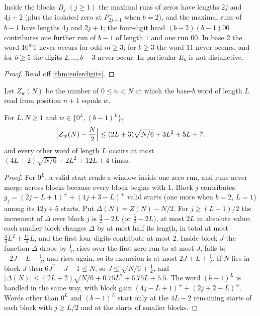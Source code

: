 \documentclass[11pt]{article}
\begin{document}
\begin{corollary}\label{cor:missing}
Inside the blocks $B_j$ $(j\ge1)$ the maximal runs of zeros have lengths $2j$ and $4j+2$
(plus the isolated zero at $P_{2j+1}^-$ when $b=2$), and the maximal runs of $b-1$ have
lengths $4j$ and $2j+1$; the four-digit head $(b-2)(b-1)00$ contributes one further run of
$b-1$ of length $1$ and one run $00$. In base
$2$ the word $10^m1$ never occurs for odd $m\ge3$; for $b\ge3$ the word $11$ never occurs,
and for $b\ge5$ the digits $2,\dots,b-3$ never occur. In particular $E_b$ is not
disjunctive.
\end{corollary}

\begin{proof}
Read off \cref{thm:eulerdigits}.
\end{proof}

Let $Z_w(N)$ be the number of $0\le n<N$ at which the base-$b$ word of length $L$ read
from position $n+1$ equals $w$.

\begin{theorem}\label{thm:eulerwords}
For $L,N\ge1$ and $w\in\{0^L,(b-1)^L\}$,
\[
\Bigl|Z_w(N)-\frac N2\Bigr|\le(2L+3)\sqrt{N/6}+3L^2+5L+7,
\]
and every other word of length $L$ occurs at most $(4L-2)\sqrt{N/6}+2L^2+12L+4$ times.
\end{theorem}

\begin{proof}
For $0^L$, a valid start reads a window inside one zero run, and runs never merge across
blocks because every block begins with $1$. Block $j$ contributes
$g_j=(2j-L+1)^++(4j+3-L)^+$ valid starts (one more when $b=2$, $L=1$) among its $12j+5$
starts. Put $\Delta(N)=Z(N)-N/2$. For $j\ge(L-1)/2$ the increment of $\Delta$ over block $j$
is $\frac32-2L$ (or $\frac52-2L$), at most $2L$ in absolute value; each smaller block changes
$\Delta$ by at most half its length, in total at most $\frac34L^2+\frac{11}4L$, and the first
four digits contribute at most $2$. Inside block $J$ the function $\Delta$ drops by
$\frac12$, rises over the first zero run to at most $J$, falls to $-2J-L-\frac12$, and
rises again, so its excursion is at most $2J+L+\frac12$. If $N$ lies in block $J$ then
$6J^2-J-1\le N$, so $J\le\sqrt{N/6}+\frac12$, and
$|\Delta(N)|\le(2L+2)\sqrt{N/6}+0.75L^2+6.75L+5.5$. The word $(b-1)^L$ is handled in the
same way, with block gain $(4j-L+1)^++(2j+2-L)^+$. Words other than $0^L$ and $(b-1)^L$
start only at the
$4L-2$ remaining starts of each block with $j\ge L/2$ and at the starts of smaller blocks.
\end{proof}
\end{document}

